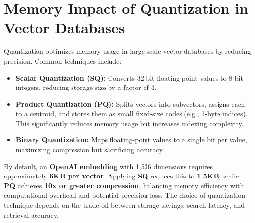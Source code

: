 \section{Memory Impact of Quantization in Vector Databases}
Quantization optimizes memory usage in large-scale vector databases by reducing precision. Common techniques include:
\begin{itemize}
    \item \textbf{Scalar Quantization (SQ):} Converts 32-bit floating-point values to 8-bit integers, reducing storage size by a factor of 4.
    \item \textbf{Product Quantization (PQ):} Splits vectors into subvectors, assigns each to a centroid, and stores them as small fixed-size codes (e.g., 1-byte indices). This significantly reduces memory usage but increases indexing complexity.
    \item \textbf{Binary Quantization:} Maps floating-point values to a single bit per value, maximizing compression but sacrificing accuracy.
\end{itemize}

By default, an \textbf{OpenAI embedding} with 1,536 dimensions requires approximately \textbf{6KB per vector}. Applying \textbf{SQ} reduces this to \textbf{1.5KB}, while \textbf{PQ} achieves \textbf{10x or greater compression}, balancing memory efficiency with computational overhead and potential precision loss. The choice of quantization technique depends on the trade-off between storage savings, search latency, and retrieval accuracy.
